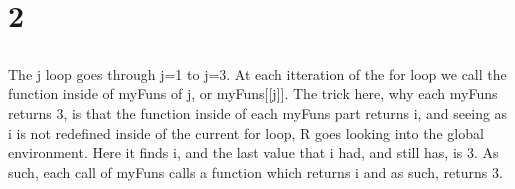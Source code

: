\section{2}
\subsection{}
The j loop goes through j=1 to j=3. At each itteration of the for loop
we call the function inside of myFuns of j, or myFuns[[j]]. The trick here,
why each myFuns returns 3, is that the function inside of each myFuns part
returns i, and seeing as i is not redefined inside of the current for loop,
R goes looking into the global environment. Here it finds i, and the last value
that i had, and still has, is 3. As such, each call of myFuns calls a function 
which returns i and as such, returns 3.

